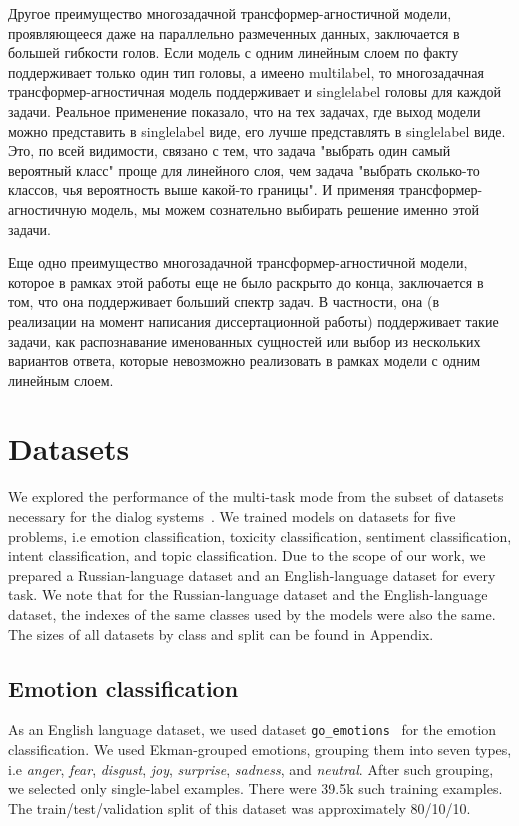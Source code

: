 \begin{itemize}
Другое преимущество многозадачной трансформер-агностичной модели, проявляющееся даже на параллельно размеченных данных, заключается в большей гибкости голов. Если модель с одним линейным слоем по факту поддерживает только один тип головы, а имеено multilabel, то многозадачная трансформер-агностичная модель поддерживает и singlelabel головы для каждой задачи. Реальное применение показало, что на тех задачах, где выход модели можно представить в singlelabel виде, его лучше представлять в singlelabel виде. Это, по всей видимости, связано с тем, что задача "выбрать один самый вероятный класс" проще для линейного слоя, чем задача "выбрать сколько-то классов, чья вероятность выше какой-то границы". И применяя трансформер-агностичную модель, мы можем сознательно выбирать решение именно этой задачи.

Еще одно преимущество многозадачной трансформер-агностичной модели, которое в рамках этой работы еще не было раскрыто до конца, заключается в том, что она поддерживает больший спектр задач. В частности, она (в реализации на момент написания диссертационной работы) поддерживает такие задачи, как распознавание именованных сущностей или выбор из нескольких вариантов ответа, которые невозможно реализовать в рамках модели с одним линейным слоем. 


\section{Datasets}


We explored the performance of the multi-task mode from the subset of datasets necessary for the dialog systems~\cite{wochat,lrec}. We trained models on datasets for five problems, i.e emotion classification, toxicity classification, sentiment classification, intent classification, and topic classification. Due to the scope of our work, we prepared a Russian-language dataset and an English-language dataset for every task. We note that for the Russian-language dataset and the English-language dataset, the indexes of the same classes used by the models were also the same. The sizes of all datasets by class and split can be found in Appendix. 

\subsection{Emotion classification }

As an English language dataset, we used dataset \texttt{go\_emotions}~\cite{emotions} for the emotion classification. We used Ekman-grouped emotions, grouping them into seven types, i.e \textit{anger}, \textit{fear}, \textit{disgust}, \textit{joy}, \textit{surprise}, \textit{sadness}, and \textit{neutral}. After such grouping, we selected only single-label examples. There were 39.5k such training examples. The train/test/validation split of this dataset was approximately 80/10/10.



\end{itemize}
